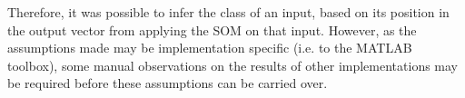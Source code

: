 \documentclass[10pt, oneside]{article}
\begin{document}
Therefore, it was possible to infer the class of an input, based on its position in the output vector from applying the SOM on that input. However, as the assumptions made may be implementation specific (i.e. to the MATLAB toolbox), some manual observations on the results of other implementations may be required before these assumptions can be carried over.


\small{}
\end{document}
